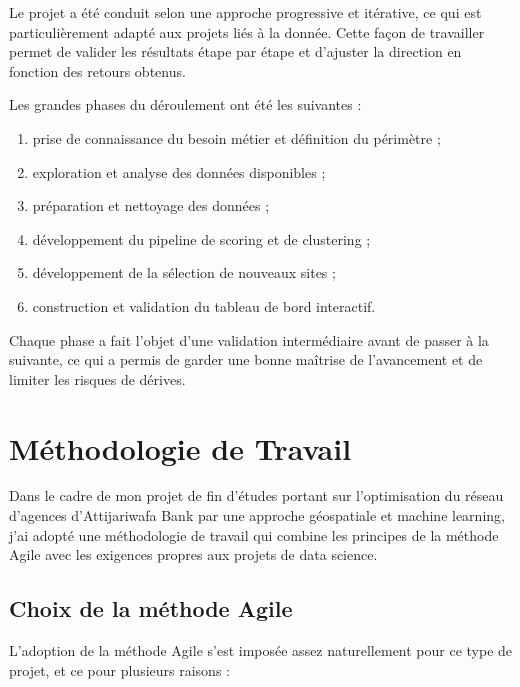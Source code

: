 \documentclass[11pt,a4paper,twoside]{report}
\begin{document}
Le projet a été conduit selon une approche progressive et itérative, ce qui est particulièrement adapté aux projets liés à la donnée. Cette façon de travailler permet de valider les résultats étape par étape et d'ajuster la direction en fonction des retours obtenus.

Les grandes phases du déroulement ont été les suivantes :
\begin{enumerate}[leftmargin=1.2cm]
    \item prise de connaissance du besoin métier et définition du périmètre ;
    \item exploration et analyse des données disponibles ;
    \item préparation et nettoyage des données ;
    \item développement du pipeline de scoring et de clustering ;
    \item développement de la sélection de nouveaux sites ;
    \item construction et validation du tableau de bord interactif.
\end{enumerate}

Chaque phase a fait l'objet d'une validation intermédiaire avant de passer à la suivante, ce qui a permis de garder une bonne maîtrise de l'avancement et de limiter les risques de dérives.

\section{Méthodologie de Travail}

Dans le cadre de mon projet de fin d'études portant sur l'optimisation du réseau d'agences
d'Attijariwafa Bank par une approche géospatiale et machine learning, j'ai adopté une
méthodologie de travail qui combine les principes de la méthode Agile avec les exigences
propres aux projets de data science.

\subsection{Choix de la méthode Agile}

L'adoption de la méthode Agile s'est imposée assez naturellement pour ce type de projet,
et ce pour plusieurs raisons :
\end{document}
